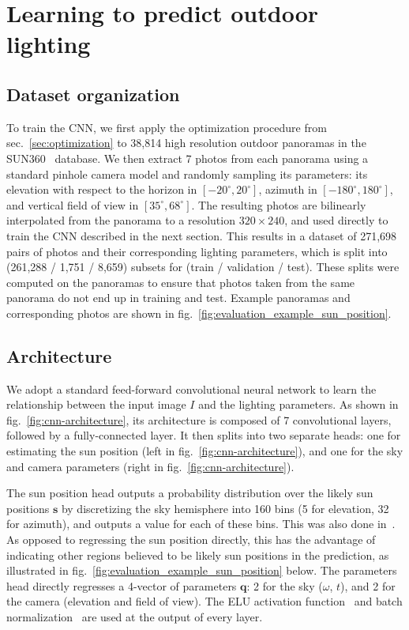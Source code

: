 \section{Learning to predict outdoor lighting}
\label{sec:cnn}

\subsection{Dataset organization}

To train the CNN, we first apply the optimization procedure from sec.~\ref{sec:optimization} to 38,814 high resolution outdoor panoramas in the SUN360~\cite{xiao-cvpr-12} database. We then extract 7 photos from each panorama using a standard pinhole camera model and randomly sampling its parameters: its elevation with respect to the horizon in $[-20^\circ, 20^\circ]$, azimuth in $[-180^\circ, 180^\circ]$, and vertical field of view in $[35^\circ, 68^\circ]$. The resulting photos are bilinearly interpolated from the panorama to a resolution $320 \times 240$, and used directly to train the CNN described in the next section. This results in a dataset of 271,698 pairs of photos and their corresponding lighting parameters, which is split into (261,288 / 1,751 / 8,659) subsets for (train / validation / test). These splits were computed on the panoramas to ensure that photos taken from the same panorama do not end up in training and test. Example panoramas and corresponding photos are shown in fig.~\ref{fig:evaluation_example_sun_position}. 

\subsection{Architecture}

We adopt a standard feed-forward convolutional neural network to learn the relationship between the input image $I$ and the lighting parameters. As shown in fig.~\ref{fig:cnn-architecture}, its architecture is composed of 7 convolutional layers, followed by a fully-connected layer. It then splits into two separate heads: one for estimating the sun position (left in fig.~\ref{fig:cnn-architecture}), and one for the sky and camera parameters (right in fig.~\ref{fig:cnn-architecture}). 

The sun position head outputs a probability distribution over the likely sun positions $\mathbf{s}$ by discretizing the sky hemisphere into 160 bins (5 for elevation, 32 for azimuth), and outputs a value for each of these bins. This was also done in~\cite{lalonde-ijcv-12}. As opposed to regressing the sun position directly, this has the advantage of indicating other regions believed to be likely sun positions in the prediction, as illustrated in fig.~\ref{fig:evaluation_example_sun_position} below. The parameters head directly regresses a 4-vector of parameters $\mathbf{q}$: 2 for the sky ($\omega$, $t$), and 2 for the camera (elevation and field of view). The ELU activation function~\cite{clevert-iclr-16} and batch normalization~\cite{ioffe-jmlr-15} are used at the output of every layer. 


